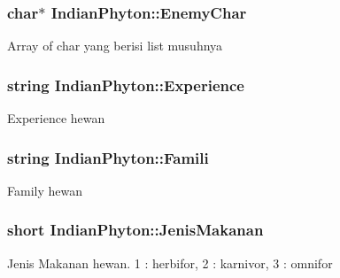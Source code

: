 \subsubsection[{\texorpdfstring{Enemy\+Char}{EnemyChar}}]{\setlength{\rightskip}{0pt plus 5cm}char$\ast$ Indian\+Phyton\+::\+Enemy\+Char\hspace{0.3cm}{\ttfamily [protected]}}\hypertarget{class_indian_phyton_a369222c3fe97923ff7b08300ae8833ad}{}\label{class_indian_phyton_a369222c3fe97923ff7b08300ae8833ad}
Array of char yang berisi list musuhnya 
\subsubsection[{\texorpdfstring{Experience}{Experience}}]{\setlength{\rightskip}{0pt plus 5cm}string Indian\+Phyton\+::\+Experience\hspace{0.3cm}{\ttfamily [protected]}}\hypertarget{class_indian_phyton_a6127b783d74687a90aaa2ec962ddb316}{}\label{class_indian_phyton_a6127b783d74687a90aaa2ec962ddb316}
Experience hewan 
\subsubsection[{\texorpdfstring{Famili}{Famili}}]{\setlength{\rightskip}{0pt plus 5cm}string Indian\+Phyton\+::\+Famili\hspace{0.3cm}{\ttfamily [protected]}}\hypertarget{class_indian_phyton_ab5aea03e94363bd76ffa575c66218a55}{}\label{class_indian_phyton_ab5aea03e94363bd76ffa575c66218a55}
Family hewan 
\subsubsection[{\texorpdfstring{Jenis\+Makanan}{JenisMakanan}}]{\setlength{\rightskip}{0pt plus 5cm}short Indian\+Phyton\+::\+Jenis\+Makanan\hspace{0.3cm}{\ttfamily [protected]}}\hypertarget{class_indian_phyton_adef9db8c3e643bb0eee4bdaf6a81c06b}{}\label{class_indian_phyton_adef9db8c3e643bb0eee4bdaf6a81c06b}
Jenis Makanan hewan. 1 \+: herbifor, 2 \+: karnivor, 3 \+: omnifor 
